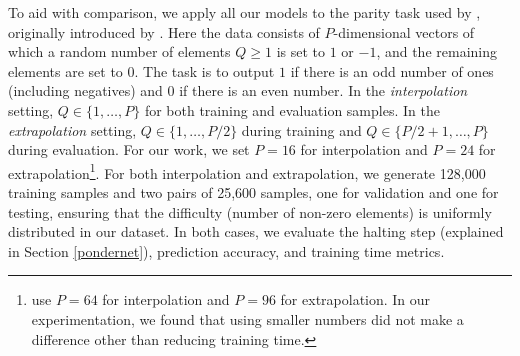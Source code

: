 \documentclass{article}
\begin{document}
To aid with comparison, we apply all our models to the parity task used by \citet{banino_pondernet_2021}, originally introduced by \citet{graves_adaptive_2017}. Here the data consists of $P$-dimensional vectors of which a random number of elements $Q \geq 1$ is set to $1$ or $-1$, and the remaining elements are set to 0. The task is to output $1$ if there is an odd number of ones (including negatives) and $0$ if there is an even number. In the \textit{interpolation} setting, $Q \in \{1, \dots, P\}$ for both training and evaluation samples. In the \textit{extrapolation} setting, $Q \in \{1, \dots, P/2\}$ during training and $Q \in \{P/2+1, \dots, P\}$ during evaluation. For our work, we set $P=16$ for interpolation and $P=24$ for extrapolation\footnote{\citet{banino_pondernet_2021} use $P=64$ for interpolation and $P=96$ for extrapolation. In our experimentation, we found that using smaller numbers did not make a difference other than reducing training time.}. For both interpolation and extrapolation, we generate 128,000 training samples and two pairs of 25,600 samples, one for validation and one for testing, ensuring that the difficulty (number of non-zero elements) is uniformly distributed in our dataset. In both cases, we evaluate the halting step (explained in Section \ref{pondernet}), prediction accuracy, and training time metrics.
\end{document}

